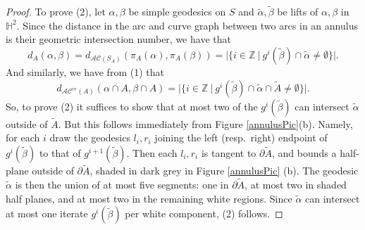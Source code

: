 \documentclass[11pt]{amsart}
\theoremstyle{remark}
\numberwithin{equation}{section}
\newcommand{\Z}{\mathbb{Z}}
\newcommand{\cAC}{\mathcal{AC}}
\newcommand{\acre}{\cAC^{re}}
\begin{document}
\begin{proof}
To prove (2), let $\alpha,\beta$  be simple geodesics on $S$ and $\tilde \alpha,\tilde \beta$ be lifts of $\alpha,\beta$ in $\mathbb H^2$. Since the distance in the arc and curve graph between two arcs in an annulus is their geometric intersection number, we have that
$$d_A(\alpha,\beta) =d_{\mathcal{AC}(S_A)}(\pi_A(\alpha),\pi_A(\beta))= | \{ i \in \Z \ | \ g^i(\tilde \beta) \cap \tilde \alpha \neq \emptyset \}|.$$ 
And similarly, we have from (1) that   $$d_{\acre(A)}(\alpha \cap A,\beta \cap A) = | \{ i \in \Z \ | \ g^i(\tilde \beta) \cap \tilde \alpha \cap \tilde A \neq \emptyset \}|.$$
So, to prove (2) it suffices to show that at most two of the $g^i(\tilde \beta)$  can intersect $\tilde \alpha$ outside of $\tilde A$. But this follows immediately from Figure \ref{annulusPic}(b). Namely, for each $i$ draw the geodesics $l_i,r_i$ joining the left (resp.\ right) endpoint of $g^i(\tilde \beta)$ to that of $g^{i+1}(\tilde \beta)$. Then each $l_i,r_i$ is tangent to $\partial \tilde A$, and bounds a half-plane outside of $\partial \tilde A$, shaded in dark grey in Figure \ref{annulusPic} (b). The geodesic $\tilde \alpha$ is then the union of at most five segments: one in $\partial \tilde A$, at most two in shaded half planes,  and at most two in the remaining white regions. Since $\tilde \alpha$  can intersect at most one iterate $g^i(\tilde \beta)$ per white component, (2) follows.
%
%


\end{proof}
\end{document}
